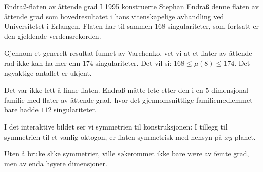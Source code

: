 \begin{surferPage}{Endraß-flaten av åttende grad}
	I 1995 konstruerte Stephan Endraß denne flaten av åttende grad som hovedresultatet i hans 
	vitenskapelige avhandling ved Universitetet i Erlangen. Flaten har til sammen $168$ singulariteter, 
	som fortsatt er den gjeldende verdensrekorden. 
  	
	Gjennom et generelt resultat funnet av Varchenko, vet vi at et flater av åttende 
	rad ikke kan ha mer enn $174$ singulariteter. Det vil si: $168 \le \mu(8) \le 174$. Det nøyaktige antallet er ukjent.
	
	Det var ikke lett å finne flaten. Endraß måtte lete etter den i en $5$-dimensjonal familie med flater 
	av åttende grad, hvor det gjennomsnittlige familiemedlemmet bare hadde $112$ singulariteter.

	I det interaktive bildet ser vi symmetrien til konstruksjonen: I tillegg til symmetrien til 
	et vanlig oktogon, er flaten symmetrisk med hensyn på $xy$-planet.

	Uten å bruke slike symmetrier, ville søkerommet ikke bare være av femte grad, men av enda høyere dimensjoner.
\end{surferPage}

